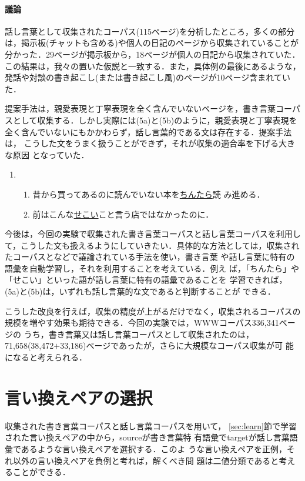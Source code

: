 \documentclass{nlp}
\begin{document}
\paragraph{議論}
話し言葉として収集されたコーパス(115ページ)を分析したところ，多くの部分
は，掲示板(チャットも含める)や個人の日記のページから収集されていることが
分かった．29ページが掲示板から，18ページが個人の日記から収集されていた．
この結果は，我々の置いた仮説と一致する．また，具体例の最後にあるような，
発話や対談の書き起こし(または書き起こし風)のページが10ページ含まれていた．

提案手法は，親愛表現と丁寧表現を全く含んでいないページを，書き言葉コーパ
スとして収集する．しかし実際には(5a)と(5b)のように，親愛表現と丁寧表現を
全く含んでいないにもかかわらず，話し言葉的である文は存在する．提案手法は，
こうした文をうまく扱うことができず，それが収集の適合率を下げる大きな原因
となっていた．
\vspace{10pt}
\begin{enumerate}
 \item
      \begin{enumerate}
       \item 昔から買ってあるのに読んでいない本を\underline{ちんたら}読
	     み進める．
       \item 前はこんな\underline{せこい}こと言う店ではなかったのに．
      \end{enumerate}
\end{enumerate}
\addtocounter{exnum}{1}
\vspace{10pt}

今後は，今回の実験で収集された書き言葉コーパスと話し言葉コーパスを利用し
て，こうした文も扱えるようにしていきたい．具体的な方法としては，収集され
たコーパスと\cite{Kilgarriff01}などで議論されている手法を使い，書き言葉
や話し言葉に特有の語彙を自動学習し，それを利用することを考えている．例え
ば，「ちんたら」や「せこい」といった語が話し言葉に特有の語彙であることを
学習できれば，(5a)と(5b)は，いずれも話し言葉的な文であると判断することが
できる．

こうした改良を行えば，収集の精度が上がるだけでなく，収集されるコーパスの
規模を増やす効果も期待できる．今回の実験では，WWWコーパス336,341ページの
うち，書き言葉又は話し言葉コーパスとして収集されたのは，
71,658(38,472$+$33,186)ページであったが，さらに大規模なコーパス収集が可
能になると考えられる．


\section{言い換えペアの選択}
収集された書き言葉コーパスと話し言葉コーパスを用いて，
\ref{sec:learn}節で学習された言い換えペアの中から，sourceが書き言葉特
有語彙でtargetが話し言葉語彙であるような言い換えペアを選択する．このよ
うな言い換えペアを正例，それ以外の言い換えペアを負例と考れば，解くべき問
題は二値分類であると考えることができる．
\end{document}
